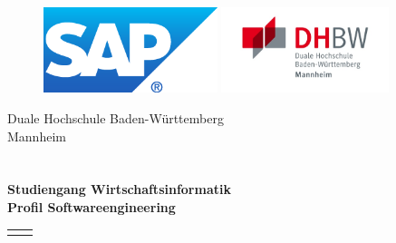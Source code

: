\documentclass[12pt,a4paper]{scrreprt}
\newif\ifsperr
\begin{document}
	\hypertarget{top}{}
	\bookmark[dest=top]{\Titel}
	\thispagestyle{empty}
	\begin{figure}[htbp]
		\begin{minipage}[!t]{4cm}
			\includegraphics[height=2.5cm, natwidth=300, natheight=148]{img/SAPlogo.png}
		\end{minipage}
		\hfill
		\begin{minipage}[!t]{5cm}
			\includegraphics [height=2.5cm, natwidth=553, natheight=282] {img/dhbw.png}
		\end{minipage}
	\end{figure}
	\begin{center}
		\large{Duale Hochschule Baden-Württemberg}\\
		\large{Mannheim}\\
		\Large{\Arbeitstyp}\\
		\vspace{20px}
		\textbf{\Large{\Titel}}\\
		\vspace{20px}
		\normalsize
		\textbf{Studiengang Wirtschaftsinformatik}\\
		\textbf{\small{Profil Softwareengineering}}\\
		\ifsperr
			\textcolor{red}{\textbf{-Sperrvermerk-}}\\
		\fi
	\end{center}
	\renewcommand{\arraystretch}{1.5}
	\begin{table}[!b]
		\begin{tabular}{ll}
			\Titelblatt{}
		\end{tabular}
	\end{table}
	\renewcommand{\arraystretch}{1}
	
	\ifsperr
		\newpage
		\hypertarget{nda}{}
\end{document}
